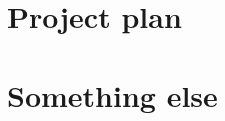 \documentclass[12pt,a4paper]{article}
\theoremstyle{definition}
\begin{document}
%  
% 
%
%





\newpage

\begin{appendices}
\section{Project plan}

\newpage
\section{Something else}
\end{appendices}
\end{document}
